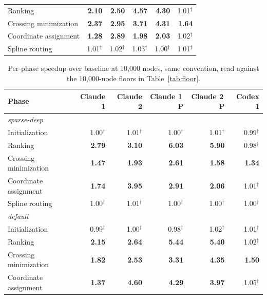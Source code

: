\begin{table}[htbp]
\begin{tabular}{lrrrrr}
Ranking               & \textbf{2.10} & \textbf{2.50} & \textbf{4.57} & \textbf{4.30} & 1.01$^\dagger$ \\
Crossing minimization & \textbf{2.37} & \textbf{2.95} & \textbf{3.71} & \textbf{4.31} & \textbf{1.64} \\
Coordinate assignment & \textbf{1.28} & \textbf{2.89} & \textbf{1.98} & \textbf{2.03} & 1.02$^\dagger$ \\
Spline routing        & 1.01$^\dagger$ & 1.02$^\dagger$ & 1.03$^\dagger$ & 1.00$^\dagger$ & 1.01$^\dagger$ \\
\bottomrule
\end{tabular}
\end{table}

\begin{table}[htbp]
\centering
\caption{Per-phase speedup over baseline at 10{,}000 nodes, same convention,
read against the 10{,}000-node floors in Table~\ref{tab:floor}.}
\label{tab:phases10k}
\small
\begin{tabular}{lrrrrr}
\toprule
\textbf{Phase} & \textbf{Claude 1} & \textbf{Claude 2} & \textbf{Claude 1\,P} & \textbf{Claude 2\,P} & \textbf{Codex 1} \\
\midrule
\multicolumn{6}{l}{\emph{sparse-deep}} \\
Initialization        & 1.00$^\dagger$ & 1.01$^\dagger$ & 1.00$^\dagger$ & 1.01$^\dagger$ & 0.99$^\dagger$ \\
Ranking               & \textbf{2.79} & \textbf{3.10} & \textbf{6.03} & \textbf{5.90} & 0.98$^\dagger$ \\
Crossing minimization & \textbf{1.47} & \textbf{1.93} & \textbf{2.61} & \textbf{1.58} & \textbf{1.34} \\
Coordinate assignment & \textbf{1.74} & \textbf{3.95} & \textbf{2.91} & \textbf{2.06} & 1.01$^\dagger$ \\
Spline routing        & 1.00$^\dagger$ & 1.01$^\dagger$ & 1.00$^\dagger$ & 1.00$^\dagger$ & 1.00$^\dagger$ \\
\midrule
\multicolumn{6}{l}{\emph{default}} \\
Initialization        & 0.99$^\dagger$ & 1.00$^\dagger$ & 0.98$^\dagger$ & 1.02$^\dagger$ & 1.01$^\dagger$ \\
Ranking               & \textbf{2.15} & \textbf{2.64} & \textbf{5.44} & \textbf{5.40} & 1.02$^\dagger$ \\
Crossing minimization & \textbf{1.82} & \textbf{2.53} & \textbf{3.31} & \textbf{4.35} & \textbf{1.50} \\
Coordinate assignment & \textbf{1.37} & \textbf{4.60} & \textbf{4.29} & \textbf{3.97} & 1.05$^\dagger$ \\

\end{tabular}
\end{table}
